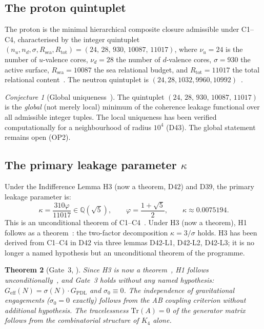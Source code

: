 \documentclass[11pt,a4paper]{article}
\theoremstyle{plain}
\newtheorem{theorem}{Theorem}[section]
\theoremstyle{definition}
\theoremstyle{remark}
\newtheorem{conjecture}[theorem]{Conjecture}
\newcommand{\quintuplet}{(24,\,28,\,930,\,10087,\,11017)}
\newcommand{\Geff}{G_{\mathrm{eff}}}
\newcommand{\GPDL}{G_{\mathrm{PDL}}}
\newcommand{\sigmaN}{\sigma(N)}
\begin{document}
\subsection{The proton quintuplet}
\label{subsec:quintuplet}
The proton is the minimal hierarchical composite closure admissible under C1--C4, characterised by the integer quintuplet $(n_u, n_d, \sigma, R_{\mathrm{sea}}, R_{\mathrm{tot}}) = \quintuplet$, where $\nu_u=24$ is the number of $u$-valence cores, $\nu_d=28$ the number of $d$-valence cores, $\sigma=930$ the active surface, $R_{\mathrm{sea}}=10087$ the sea relational budget, and $R_{\mathrm{tot}}=11017$ the total relational content~\cite{D01,D16,D16a,D16b}. The neutron quintuplet is $(24,28,1032,9960,10992)$~\cite{D22}.

\begin{conjecture}[Global uniqueness~\cite{D16,D16b}]
\label{conj:uniqueness}
The quintuplet $\quintuplet$ is the \emph{global} (not merely local) minimum of the coherence leakage functional over all admissible integer tuples. The local uniqueness has been verified computationally for a neighbourhood of radius $10^4$ (D43). The global statement remains open (OP2).
\end{conjecture}

\subsection{The primary leakage parameter \texorpdfstring{$\kappa$}{kappa}}
\label{subsec:kappa}
Under the Indifference Lemma H3 (now a theorem, D42) and D39, the primary leakage parameter is:
\begin{equation}
\kappa = \frac{310\varphi}{11017} \in \mathbb{Q}(\sqrt{5}), \qquad \varphi = \frac{1+\sqrt{5}}{2}, \qquad \kappa \approx 0.0075194.
\end{equation}
This is an unconditional theorem of C1--C4~\cite{D39,D42}. Under H3 (now a theorem), H1 follows as a theorem~\cite{D39}: the two-factor decomposition $\kappa=3/\sigma$ holds. H3 has been derived from C1--C4 in D42 via three lemmas D42-L1, D42-L2, D42-L3; it is no longer a named hypothesis but an unconditional theorem of the programme.

\begin{theorem}[Gate~3, \cite{D36}]
\label{thm:Gate3}
Since H3 is now a theorem~\cite{D42}, H1 follows unconditionally~\cite{D39}, and Gate~3 holds without any named hypothesis: $\Geff(N)=\sigmaN\cdot\GPDL$ and $\sigma_0\equiv 0$. The independence of gravitational engagements ($\sigma_0=0$ exactly) follows from the AB coupling criterion without additional hypothesis. The tracelessness $\mathrm{Tr}(A)=0$ of the generator matrix follows from the combinatorial structure of $K_4$ alone.
\end{theorem}
\end{document}
